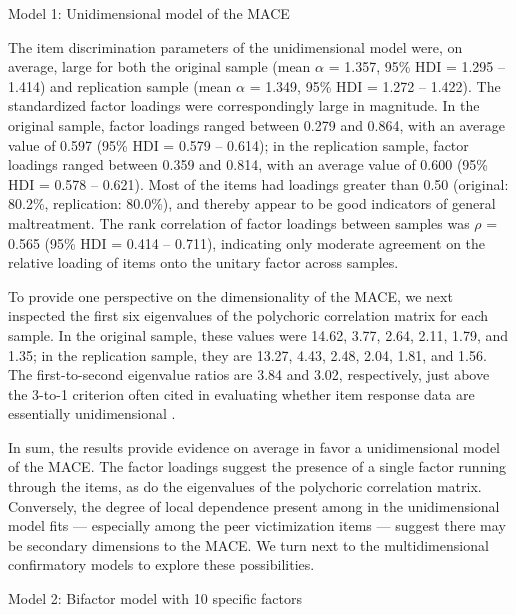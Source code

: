 \documentclass[letterpaper,man,natbib]{apa6}  %
\makeatletter
\renewcommand{\subsubsection}{\@startsection{subsubsection}{3}
  {\z@}%
  {\b@level@two@skip}{\e@level@two@skip}%
  {\normalfont\normalsize\bfseries}}
\makeatother
\begin{document}
\subsubsection{Model 1: Unidimensional model of the MACE}

The item discrimination parameters of the unidimensional model were, on average, large for both the original sample (mean $\alpha$ = 1.357, 95\% HDI = 1.295 -- 1.414) and replication sample (mean $\alpha$ = 1.349, 95\% HDI = 1.272 -- 1.422). The standardized factor loadings were correspondingly large in magnitude. In the original sample, factor loadings ranged between 0.279 and 0.864, with an average value of 0.597 (95\% HDI = 0.579 -- 0.614); in the replication sample, factor loadings ranged between 0.359 and 0.814, with an average value of 0.600 (95\% HDI = 0.578 -- 0.621). Most of the items had loadings greater than 0.50 (original: 80.2\%, replication: 80.0\%), and thereby appear to be good indicators of general maltreatment. The rank correlation of factor loadings between samples was $\rho$ = 0.565 (95\% HDI = 0.414 -- 0.711), indicating only moderate agreement on the relative loading of items onto the unitary factor across samples. 

To provide one perspective on the dimensionality of the MACE, we next inspected the first six eigenvalues of the polychoric correlation matrix for each sample. In the original sample, these values were 14.62, 3.77, 2.64, 2.11, 1.79, and 1.35; in the replication sample, they are 13.27, 4.43, 2.48, 2.04, 1.81, and 1.56. The first-to-second eigenvalue ratios are 3.84 and 3.02, respectively, just above the 3-to-1 criterion often cited in evaluating whether item response data are essentially unidimensional \citep{embretson2013item}. 

In sum, the results provide evidence on average in favor a unidimensional model of the MACE. The factor loadings suggest the presence of a single factor running through the items, as do the eigenvalues of the polychoric correlation matrix. Conversely, the degree of local dependence present among in the unidimensional model fits --- especially among the peer victimization items --- suggest there may be secondary dimensions to the MACE. We turn next to the multidimensional confirmatory models to explore these possibilities.

\subsubsection{Model 2: Bifactor model with 10 specific factors}
\end{document}
